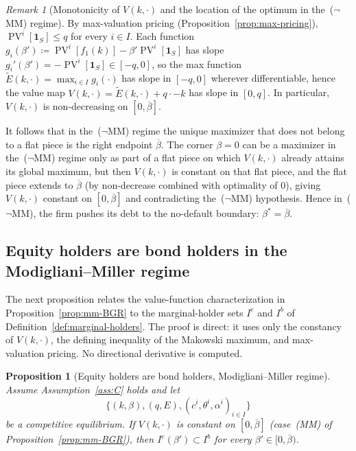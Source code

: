 \documentclass[11pt,a4paper,oneside]{book}
\def\1{\mathbf{1}}
\def\leq{\leqslant}
\DeclareMathOperator{\PV}{PV}
\theoremstyle{plain}
\newtheorem{proposition}[theorem]{Proposition}
\theoremstyle{definition}
\theoremstyle{remark}
\newtheorem{remark}[theorem]{Remark}
\numberwithin{equation}{chapter}
\begin{document}
\begin{remark}[Monotonicity of $V(k, \cdot)$ and the location of the optimum in the~($\neg$MM) regime]\label{rem:V-monotone}
By max-valuation pricing (Proposition~\ref{prop:max-pricing}), $\PV^i[\1_S] \leq q$ for every $i \in I$. Each function $g_i(\beta') \coloneqq \PV^i[f_1(k)] - \beta' \PV^i[\1_S]$ has slope $g_i'(\beta') = -\PV^i[\1_S] \in [-q, 0]$, so the max function $\widetilde{E}(k, \cdot) = \max_{i \in I} g_i(\cdot)$ has slope in $[-q, 0]$ wherever differentiable, hence the value map $V(k, \cdot) = \widetilde{E}(k, \cdot) + q \cdot - k$ has slope in $[0, q]$. In particular, $V(k, \cdot)$ is non-decreasing on $[0, \overline{\beta}]$.

It follows that in the~($\neg$MM) regime the unique maximizer that does not belong to a flat piece is the right endpoint $\overline{\beta}$. The corner $\beta = 0$ can be a maximizer in the~($\neg$MM) regime only as part of a flat piece on which $V(k, \cdot)$ already attains its global maximum, but then $V(k, \cdot)$ is constant on that flat piece, and the flat piece extends to $\overline{\beta}$ (by non-decrease combined with optimality of $0$), giving $V(k, \cdot)$ constant on $[0, \overline{\beta}]$ and contradicting the~($\neg$MM) hypothesis. Hence in~($\neg$MM), the firm pushes its debt to the no-default boundary: $\beta^\ast = \overline{\beta}$.
\end{remark}

\subsection{Equity holders are bond holders in the Modigliani--Miller regime}
\label{subsec:eh-are-bh}

The next proposition relates the value-function characterization in Proposition~\ref{prop:mm-BGR} to the marginal-holder sets $I^e$ and $I^b$ of Definition~\ref{def:marginal-holders}. The proof is direct: it uses only the constancy of $V(k, \cdot)$, the defining inequality of the Makowski maximum, and max-valuation pricing. No directional derivative is computed.

\begin{proposition}[Equity holders are bond holders, Modigliani--Miller regime]\label{prop:eh-are-bh}
Assume Assumption~\ref{ass:C} holds and let
\begin{equation*}
  \bigl\{ (k, \beta), (q, E), (c^i, \theta^i, \alpha^i)_{i \in I} \bigr\}
\end{equation*}
be a competitive equilibrium. If $V(k, \cdot)$ is constant on $[0, \overline{\beta}]$ \textup{(}case~\textup{(MM)} of Proposition~\textup{\ref{prop:mm-BGR}}\textup{)}, then $I^e(\beta') \subset I^b$ for every $\beta' \in [0, \overline{\beta})$.
\end{proposition}
\end{document}
